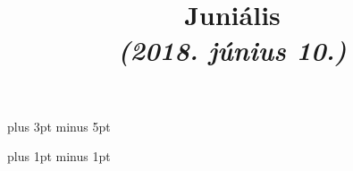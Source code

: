 \documentclass[a4paper,landscape]{article}
\title{Juniális\\\textit{(2018. június 10.)}}
\date{}
\renewcommand{\_}[1]{\underline{#1}} %
\begin{document}



  \versesep=12pt plus 3pt minus 5pt

  \iflyric
    \baselineadj=2pt plus 1pt minus 1pt
  \fi


  \begin{songs}{}
    

    \renewcommand{\thesongnum}{K\arabic{songnum}}
    \setcounter{songnum}{146}
    \setlength{\songnumwidth}{1.45cm}
    

    \renewcommand{\thesongnum}{T\arabic{songnum}}
    \setlength{\songnumwidth}{1.1cm}
    

    \renewcommand{\thesongnum}{K\arabic{songnum}}
    

    \renewcommand{\thesongnum}{M\arabic{songnum}}
    \setlength{\songnumwidth}{1.25cm}
    
  \end{songs}


\end{document}
